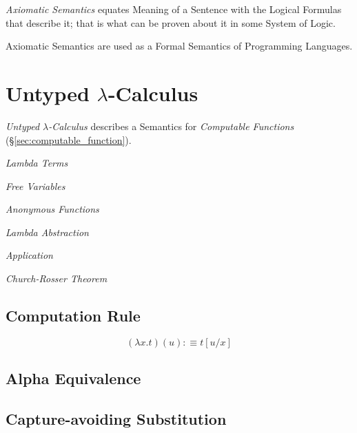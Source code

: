 \emph{Axiomatic Semantics} equates Meaning of a Sentence with the
Logical Formulas that describe it; that is what can be proven about it
in some System of Logic.

Axiomatic Semantics are used as a Formal Semantics of Programming
Languages.



\section{Untyped $\lambda$-Calculus}\label{sec:untyped_lambda}

\emph{Untyped $\lambda$-Calculus} describes a Semantics for
\emph{Computable Functions} (\S\ref{sec:computable_function}).

\emph{Lambda Terms}

\emph{Free Variables}

\emph{Anonymous Functions}

\emph{Lambda Abstraction}

\emph{Application}

\emph{Church-Rosser Theorem}



\subsection{Computation Rule}\label{sec:computation_rule}

\[
    (\lambda x.t)(u) :\equiv t[u/x]
\]

\subsection{Alpha Equivalence}\label{sec:alpha_equivalent}

\subsection{Capture-avoiding Substitution}\label{sec:capture_avoiding}

